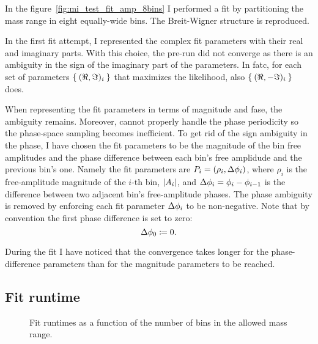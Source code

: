     In the figure~\ref{fig:mi_test_fit_amp_8bins} I performed a fit by partitioning the mass range in eight equally-wide bins.
    The Breit-Wigner structure is reproduced.




    In the first fit attempt, I represented the complex fit parameters with their real and imaginary parts.
    With this choice, the pre-run did not converge as there is an ambiguity in the sign of the imaginary part of the parameters.
    In fatc, for each set of parameters $\Set{(\Re,\Im)_i}$ that maximizes the likelihood, also $\Set{(\Re,-\Im)_i}$ does.


    When representing the fit parameters in terms of magnitude and fase, the ambiguity remains.
    Moreover,  cannot properly handle the phase periodicity so the phase-space sampling becomes inefficient.
    To get rid of the sign ambiguity in the phase, I have chosen the fit parameters to be the magnitude of the bin free amplitudes and the phase difference between each bin's free amplidude and the previous bin's one.
    Namely the fit parameters are $P_i = (\rho_i, \mathop{}\!\textup{$\Delta$}\phi_i)$, where $\rho_i$ is the free-amplitude magnitude of the $i$-th bin, $\lvert A_i\rvert$, and $\mathop{}\!\textup{$\Delta$}\phi_i = \phi_i - \phi_{i-1}$ is the difference between two adjacent bin's free-amplitude phases. 
    The phase ambiguity is removed by enforcing each fit parameter $\mathop{}\!\textup{$\Delta$}\phi_i$ to be non-negative.
    Note that by convention the first phase difference is set to zero:
    \begin{equation}\label{eq:delta_phi_zero_cond}
        \mathop{}\!\textup{$\Delta$}\phi_0 \coloneqq 0.
    \end{equation}

    During the fit I have noticed that the convergence takes longer for the phase-difference parameters than for the magnitude parameters to be reached.

    \subsection{Fit runtime}


    \begin{figure}
        \centering
        \caption{Fit runtimes as a function of the number of bins in the allowed mass range.}
        \label{fig:time_scale}
    \end{figure}

